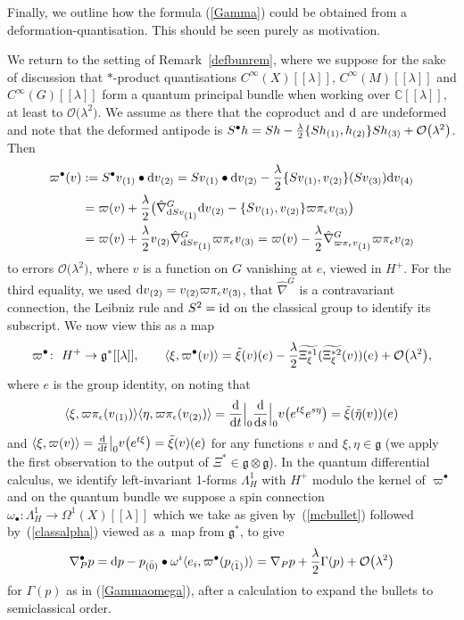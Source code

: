 \documentclass[10pt,a4paper]{amsart}
\numberwithin{equation}{section}
\newcommand{\C}{{\mathbb{C}}}
\newcommand{\<}{{\langle}}
\renewcommand{\>}{{\rangle}}
\newcommand{\tens}{\otimes}
\newcommand{\id}{{\rm id}}
\renewcommand{\o}{{}_{\scriptstyle(1)}}
\renewcommand{\t}{{}_{\scriptstyle(2)}}
\renewcommand{\th}{{}_{\scriptstyle(3)}}
\newcommand{\fo}{{}_{\scriptstyle(4)}}
\newcommand{\extd}{{\rm d}}
\newcommand{\eps}{\epsilon}
\newcommand{\co}{{}_{\scriptstyle \bar{(1)}}}
\newcommand{\rz}{{}_{\scriptstyle \bar{(0)}}}
\newcommand{\cg}{{\mathfrak{g}}}
\begin{document}
Finally, we outline how the formula (\ref{Gamma}) could be obtained from a deformation-quantisation. This should be seen purely as motivation.

\begin{Remark}\label{wedgeHequalsg} We return to the setting of Remark~\ref{defbunrem}, where we suppose for the sake of discussion that $*$-product quantisations $C^\infty(X)[[\lambda]]$, $C^\infty(M)[[\lambda]]$ and $C^\infty(G)[[\lambda]]$ form a quantum principal bundle when working over $\C[[\lambda]]$, at least to $\mathcal{O}\big(\lambda^2\big)$. We assume as there that the coproduct and $\extd$ are undeformed and note that the deformed antipode is $S^\bullet h=S h -{\lambda\over 2}\{S h\o,h\t\}S h\th+\mathcal{O}\big(\lambda^2\big)$. Then
\begin{align*} \varpi^\bullet (v)&:=S^\bullet v\o\bullet \extd v\t= S v\o\bullet \extd v\t- {\lambda\over 2}\{Sv\o,v\t\}(Sv\th)\extd v\fo\\
&=\varpi(v)+{\lambda\over 2}\big(\hat\nabla^G_{\extd Sv\o}\extd v\t-\{Sv\o,v\t\}\varpi\pi_\eps v\th\big)\\
&=\varpi(v)+ {\lambda\over 2}v\t \hat\nabla^G_{\extd Sv\o}\varpi\pi_\eps v\th=\varpi(v)-{\lambda\over 2}\hat\nabla^G_{\varpi\pi_\eps v\o}\varpi\pi_\eps v\t\end{align*}
to errors $\mathcal{O}\big(\lambda^2\big)$, where $v$ is a function on $G$ vanishing at $e$, viewed in $H^+$. For the third equality, we used $\extd v\t= v\t \varpi\pi_\eps v\th$, that $\hat\nabla^G$ is a contravariant connection, the Leibniz rule and $S^2=\id$ on the classical group to identify its subscript. We now view this as a map
\begin{equation}\label{mcbullet} \varpi^\bullet \colon \ H^+\to \cg^*[[\lambda]],\qquad \<\xi,\varpi^\bullet (v)\>=\tilde\xi(v)(e) - {\lambda\over 2}\widetilde{\Xi_\xi^{*1}}(\widetilde{\Xi_\xi^{*2}}(v))(e)+\mathcal{O}\big(\lambda^2\big),\end{equation}
 where $e$ is the group identity, on noting that
 \begin{equation*}\label{Xi2} \<\xi,\varpi\pi_\eps(v\o)\>\<\eta,\varpi\pi_\eps(v\t)\>={\extd\over\extd t}\Big|_0{\extd \over\extd s}\Big|_0v\big(e^{t\xi}e^{s\eta}\big)=\tilde\xi(\tilde\eta(v))(e)\end{equation*}
and $\<\xi,\varpi(v)\>={\extd \over\extd t}\big|_0v\big(e^{t\xi}\big)=\tilde\xi(v)(e)$ for any functions $v$ and $\xi,\eta\in\cg$ (we apply the first observation to the output of $\Xi^*\in \cg\tens\cg$). In the quantum differential calculus, we identify left-invariant 1-forms $\Lambda^1_H$ with $H^+$ modulo the kernel of $\varpi^\bullet $ and on the quantum bundle we suppose a spin connection $\omega_\bullet\colon \Lambda^1_H\to \Omega^1(X)[[\lambda]]$ which we take as given by~(\ref{mcbullet}) followed by~(\ref{classalpha}) viewed as a~map from $\cg^*$, to give
\[ \nabla^\bullet_P p=\extd p - p\rz \bullet \omega^i\<e_i,\varpi^\bullet (p\co)\>=\nabla_P p +{\lambda\over 2}\Gamma(p)+\mathcal{O}\big(\lambda^2\big)\]
for $\Gamma(p)$ as in (\ref{Gammaomega}), after a calculation to expand the bullets to semiclassical order. \end{Remark}
\end{document}
